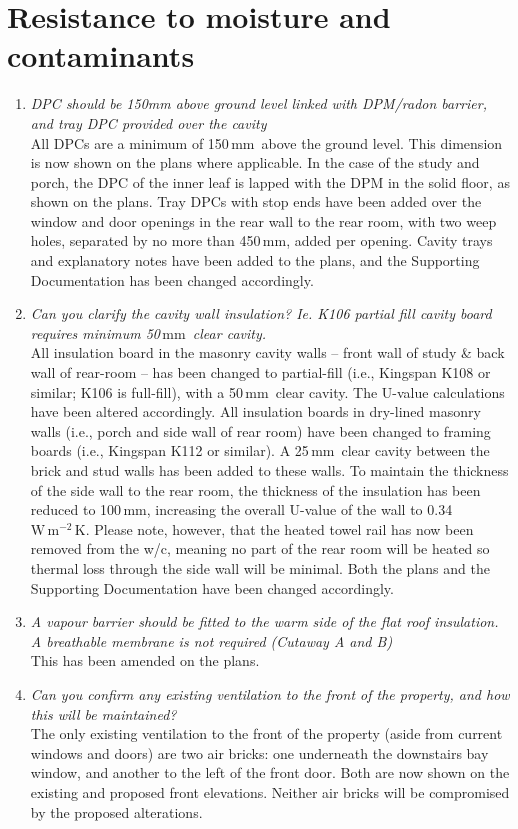 \documentclass{extension}
\newcommand{\mm}{\,$\mathrm{mm}$}
\newcommand{\uunit}{\,$\mathrm{W\,m^{-2}\,K}$}
\begin{document}
\section{Resistance to moisture and contaminants}
\begin{enumerate}
\item {\it DPC should be 150mm above ground level linked with DPM/radon barrier, and tray DPC provided over the cavity}\\
All DPCs are a minimum of 150\mm\ above the ground level. This dimension is now shown on the plans where applicable. In the case of the study and porch, the DPC of the inner leaf is lapped with the DPM in the solid floor, as shown on the plans. Tray DPCs with stop ends have been added over the window and door openings in the rear wall to the rear room, with two weep holes, separated by no more than 450\mm , added per opening. Cavity trays and explanatory notes have been added to the plans, and the Supporting Documentation has been changed accordingly.
\item {\it Can you clarify the cavity wall insulation? Ie. K106 partial fill cavity board requires minimum 50\mm\ clear cavity.}\\
All insulation board in the masonry cavity walls -- front wall of study \& back wall of rear-room -- has been changed to partial-fill (i.e., Kingspan K108 or similar; K106 is full-fill), with a 50\mm\ clear cavity. The U-value calculations have been altered accordingly. All insulation boards in dry-lined masonry walls (i.e., porch and side wall of rear room) have been changed to framing boards (i.e., Kingspan K112 or similar). A 25\mm\ clear cavity between the brick and stud walls has been added to these walls. To maintain the thickness of the side wall to the rear room, the thickness of the insulation has been reduced to 100\mm , increasing the overall U-value of the wall to 0.34\,\uunit . Please note, however, that the heated towel rail has now been removed from the w/c, meaning no part of the rear room will be heated so thermal loss through the side wall will be minimal. Both the plans and the Supporting Documentation have been changed accordingly.
\item {\it A vapour barrier should be fitted to the warm side of the flat roof insulation. A breathable membrane is not required (Cutaway A and B)}\\
This has been amended on the plans.
\item {\it Can you confirm any existing ventilation to the front of the property, and how this will be maintained?}\\
The only existing ventilation to the front of the property (aside from current windows and doors) are two air bricks: one underneath the downstairs bay window, and another to the left of the front door. Both are now shown on the existing and proposed front elevations. Neither air bricks will be compromised by the proposed alterations.
\end{enumerate}
\end{document}
